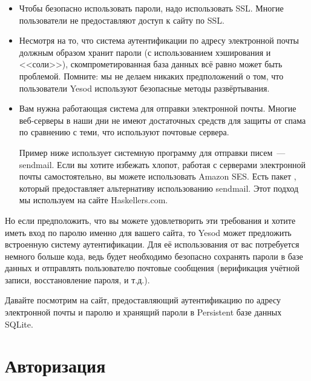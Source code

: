 \begin{itemize}
    \item Чтобы безопасно использовать пароли, надо использовать SSL. Многие
        пользователи не предоставляют доступ к сайту по SSL.

    \item Несмотря на то, что система аутентификации по адресу электронной
        почты должным образом хранит пароли (с использованием хэширования и
        <<соли>>), скомпрометированная база данных всё равно может быть
        проблемой. Помните: мы не делаем никаких предположений о том, что
        пользователи Yesod используют безопасные методы развёртывания.

    \item Вам нужна работающая система для отправки электронной почты. Многие
        веб-серверы в наши дни не имеют достаточных средств для защиты от спама
        по сравнению с теми, что используют почтовые сервера.

    \begin{remark}
        Пример ниже использует системную программу для отправки писем~---
        sendmail. Если вы хотите избежать хлопот, работая с серверами
        электронной почты самостоятельно, вы можете использовать Amazon SES.
        Есть пакет
        ,
        который предоставляет альтернативу использованию sendmail. Этот подход
        мы используем на сайте Haskellers.com.
    \end{remark}
\end{itemize}

Но если предположить, что вы можете удовлетворить эти требования и хотите иметь
вход по паролю именно для вашего сайта, то Yesod может предложить встроенную
систему аутентификации. Для её использования от вас потребуется немного больше
кода, ведь будет необходимо безопасно сохранять пароли в базе данных и
отправлять пользователю почтовые сообщения (верификация учётной записи,
восстановление пароля, и т.д.).

Давайте посмотрим на сайт, предоставляющий аутентификацию по адресу электронной
почты и паролю и хранящий пароли в Persistent базе данных SQLite.


\section{Авторизация}


